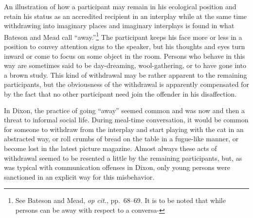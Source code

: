 \documentclass[twoside,symmetric,nobib,justified]{tufte-book}
\begin{document}
An illustration of how a participant may remain in his ecological
position and retain his status as an accredited recipient in an
interplay while at the same time withdrawing into imaginary places and
imaginary interplays is found in what Bateson and Mead call
``away.''\footnote{See Bateson and Mead, \emph{op cit.}, pp.~68--69. It
  is to be noted that while persons can be away with respect to a
  conversa-} The participant keeps his
face more or less in a position to convey attention signs to the
speaker, but his thoughts and eyes turn inward or come to focus on some
object in the room. Persons who behave in this way are sometimes said to
be day-dreaming, wool-gathering, or to have gone into a brown study.
This kind of withdrawal may be rather apparent to the remaining
participants, but the obviousness of the withdrawal is apparently
compensated for by the fact that no other participant need join the
offender in his disaffection.

In Dixon, the practice of going ``away'' seemed common and was now and
then a threat to informal social life. During meal-time conversation, it
would be common for someone to withdraw from the interplay and start
playing with the cat in an abstracted way, or roll crumbs of bread on
the table in a fugue-like manner, or become lost in the latest picture
magazine. Almost always these acts of withdrawal seemed to be resented a
little by the remaining participants, but, as was typical with
communication offenses in Dixon, only young persons were sanctioned in
an explicit way for this misbehavior.
\end{document}

